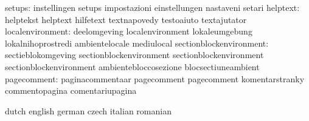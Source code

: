                    setups: instellingen              setups
                           impostazioni              einstellungen
                           nastaveni                 setari
                 helptext: helptekst                 helptext
                           hilfetext                 textnapovedy
                           testoaiuto                textajutator
         localenvironment: deelomgeving              localenvironment
                           lokaleumgebung            lokalnihoprostredi
                           ambientelocale            mediulocal
  sectionblockenvironment: sectieblokomgeving        sectionblockenvironment
                           sectionblockenvironment   sectionblockenvironment
                           ambientebloccosezione     blocsectiuneambient %
              pagecomment: paginacommentaar          pagecomment
                           pagecomment               komentarstranky
                           commentopagina            comentariupagina %

\stopvariables




\startvariables            dutch                     english
                           german                    czech
                           italian                   romanian

